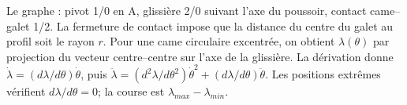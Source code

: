\begin{corrigebox}
Le graphe : pivot 1/0 en A, glissière 2/0 suivant l'axe du poussoir,
                contact came--galet 1/2.
La fermeture de contact impose que la distance du centre du galet au
                profil soit le rayon $r$. Pour une came circulaire excentrée, on obtient
                $\lambda(\theta)$ par projection du vecteur centre--centre sur l'axe de la
                glissière.
La dérivation donne
                $\dot\lambda=(d\lambda/d\theta)\dot\theta$, puis
                $\ddot\lambda=(d^2\lambda/d\theta^2)\dot\theta^2+
                (d\lambda/d\theta)\ddot\theta$.
Les positions extrêmes vérifient $d\lambda/d\theta=0$; la course est
                $\lambda_{max}-\lambda_{min}$.
\end{corrigebox}
